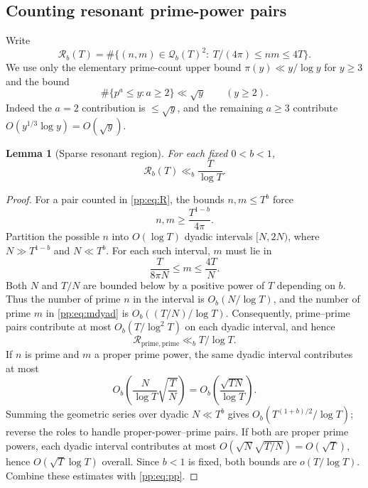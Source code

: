 \documentclass[11pt,reqno]{amsart}
\numberwithin{equation}{section}
\newtheorem{lemma}[theorem]{Lemma}
\begin{document}
\subsection{Counting resonant prime-power pairs}
Write
\begin{equation}
\mathcal R_b(T)=\#\{(n,m)\in\mathcal Q_b(T)^2:\ T/(4\pi)\le nm\le4T\}.
\label{pp:eq:R}
\end{equation}
We use only the elementary prime-count upper bound $\pi(y)\ll y/\log y$ for $y\ge3$ and the bound
\begin{equation}
\#\{p^a\le y:a\ge2\}\ll\sqrt y\qquad(y\ge2).
\label{pp:eq:powercount}
\end{equation}
Indeed the $a=2$ contribution is $\le\sqrt y$, and the remaining $a\ge3$ contribute $O(y^{1/3}\log y)=O(\sqrt y)$.

\begin{lemma}[Sparse resonant region]\label{pp:lem:pairs}
For each fixed $0<b<1$,
\begin{equation}
\mathcal R_b(T)\ll_b\frac{T}{\log T}.
\label{pp:eq:paircount}
\end{equation}
\end{lemma}
\begin{proof}
For a pair counted in \eqref{pp:eq:R}, the bounds $n,m\le T^b$ force
\begin{equation}
 n,m\ge\frac{T^{1-b}}{4\pi}.
\label{pp:eq:bothlarge}
\end{equation}
Partition the possible $n$ into $O(\log T)$ dyadic intervals $[N,2N)$, where $N\gg T^{1-b}$ and $N\ll T^b$. For each such interval, $m$ must lie in
\begin{equation}
\frac{T}{8\pi N}\le m\le\frac{4T}{N}.
\label{pp:eq:mdyad}
\end{equation}
Both $N$ and $T/N$ are bounded below by a positive power of $T$ depending on $b$. Thus the number of prime $n$ in the interval is $O_b(N/\log T)$, and the number of prime $m$ in \eqref{pp:eq:mdyad} is $O_b((T/N)/\log T)$. Consequently, prime--prime pairs contribute at most $O_b(T/\log^2T)$ on each dyadic interval, and hence
\begin{equation}
\mathcal R_{\mathrm{prime},\mathrm{prime}}\ll_b T/\log T.
\label{pp:eq:pp}
\end{equation}
If $n$ is prime and $m$ a proper prime power, the same dyadic interval contributes at most
\[
O_b\left(\frac{N}{\log T}\sqrt{\frac{T}{N}}\right)
=O_b\left(\frac{\sqrt{TN}}{\log T}\right).
\]
Summing the geometric series over dyadic $N\ll T^b$ gives
$O_b(T^{(1+b)/2}/\log T)$; reverse the roles to handle proper-power--prime pairs. If both are proper prime powers, each dyadic interval contributes at most
$O(\sqrt N\sqrt{T/N})=O(\sqrt T)$, hence $O(\sqrt T\log T)$ overall. Since $b<1$ is fixed, both bounds are $o(T/\log T)$. Combine these estimates with \eqref{pp:eq:pp}.
\end{proof}
\end{document}
